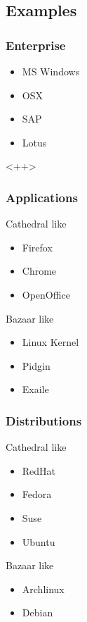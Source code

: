\documentclass[hyperref={pdfpagelabels=false},xcolor=pst,pdf,fragile]{beamer}
\begin{document}
\subsection{Examples}

\begin{frame}
  \frametitle{Enterprise}

  \begin{itemize}
	\item MS Windows
	\item OSX
	\item SAP
	\item Lotus
  \end{itemize}<++>

\end{frame}

\begin{frame}
  \frametitle{Applications}

  \begin{block}{Cathedral like}
	\begin{itemize}
	  \item Firefox
	  \item Chrome
	  \item OpenOffice
	\end{itemize}
  \end{block}

  \begin{block}{Bazaar like}
	\begin{itemize}
	  \item Linux Kernel
	  \item Pidgin
	  \item Exaile
	\end{itemize}
  \end{block}

\end{frame}

\begin{frame}
  \frametitle{Distributions}

  \begin{block}{Cathedral like}
	\begin{itemize}
	  \item RedHat
	  \item Fedora
	  \item Suse
	  \item Ubuntu
	\end{itemize}
  \end{block}

  \begin{block}{Bazaar like}
	\begin{itemize}
	  \item Archlinux
	  \item Debian
	\end{itemize}
  \end{block}

\end{frame}
\end{document}
